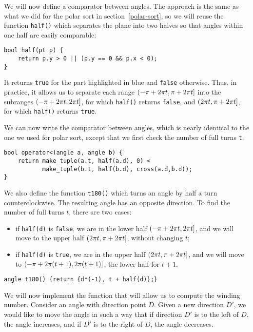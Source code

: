 We will now define a comparator between angles. The approach is the same as what we did for the polar sort in section~\ref{polar-sort}, so we will reuse the function \lstinline|half()| which separates the plane into two halves so that angles within one half are easily comparable:
\begin{lstlisting}
bool half(pt p) {
    return p.y > 0 || (p.y == 0 && p.x < 0);
}
\end{lstlisting}

It returns \lstinline|true| for the part highlighted in blue and \lstinline|false| otherwise. Thus, in practice, it allows us to separate each range $(-\pi + 2\pi t, \pi + 2\pi t]$ into the subranges $(-\pi + 2\pi t, 2\pi t]$, for which \lstinline|half()| returns \lstinline|false|, and $(2\pi t, \pi + 2\pi t]$, for which \lstinline|half()| returns \lstinline|true|.

We can now write the comparator between angles, which is nearly identical to the one we used for polar sort, except that we first check the number of full turns \lstinline|t|.
\begin{lstlisting}
bool operator<(angle a, angle b) {
    return make_tuple(a.t, half(a.d), 0) <
           make_tuple(b.t, half(b.d), cross(a.d,b.d));
}
\end{lstlisting}

We also define the function \lstinline|t180()| which turns an angle by half a turn counterclockwise. The resulting angle has an opposite direction. To find the number of full turns $t$, there are two cases:
\begin{itemize}
\item if \lstinline|half(d)| is \lstinline|false|, we are in the lower half $(-\pi + 2\pi t, 2\pi t]$, and we will move to the upper half $(2\pi t, \pi + 2\pi t]$, without changing $t$;
\item if \lstinline|half(d)| is \lstinline|true|, we are in the upper half $(2\pi t, \pi + 2\pi t]$, and we will move to $(-\pi + 2\pi (t+1), 2\pi (t+1)]$, the lower half for $t+1$.
\end{itemize}
\begin{lstlisting}
angle t180() {return {d*(-1), t + half(d)};}
\end{lstlisting}

We will now implement the function that will allow us to compute the winding number. Consider an angle with direction point $D$. Given a new direction $D'$, we would like to move the angle in such a way that if direction $D'$ is to the left of $D$, the angle increases, and if $D'$ is to the right of $D$, the angle decreases.


